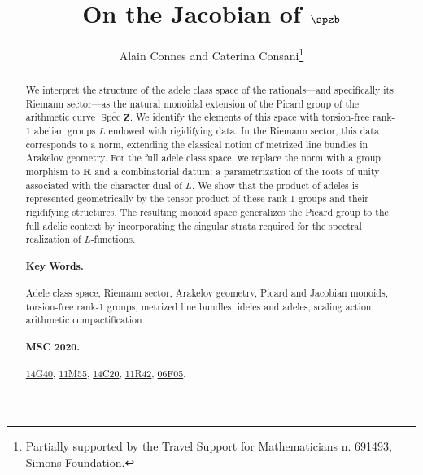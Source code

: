 \documentclass[11pt,a4paper]{article}
\title{On the Jacobian of $\spzb$}
\author{Alain Connes and Caterina Consani\thanks{Partially supported by the Travel Support for Mathematicians n. 691493, Simons Foundation.}}
\date{}
\newcommand{\Z}{\mathbf{Z}}
\newcommand{\R}{\mathbf{R}}
\theoremstyle{plain}
\theoremstyle{definition} %
\begin{document}
\maketitle

\begin{abstract}
\noindent We interpret the structure of the adele class space of the rationals—and specifically its Riemann sector—as the natural monoidal extension of the Picard group of the arithmetic curve $\overline{\operatorname{Spec} \Z}$.  We identify the elements of this space with torsion-free rank-1 abelian groups $L$ endowed with rigidifying data. In the Riemann sector, this data corresponds to a norm, extending the classical notion of metrized line bundles in Arakelov geometry. For the full adele class space, we replace the norm with a group morphism to $\R$ and a combinatorial datum: a parametrization of the roots of unity associated with the character dual of $L$. We show that the product of adeles is represented geometrically by the tensor product of these rank-1 groups and their rigidifying structures. 
The resulting monoid space generalizes the Picard group to the full adelic context by incorporating the singular strata required for the spectral realization of $L$-functions.

\paragraph{Key Words.} Adele class space, Riemann sector, Arakelov geometry, \sloppy Picard and Jacobian monoids, torsion-free rank-1 groups, metrized line bundles, ideles and adeles,  scaling action, arithmetic compactification.

\paragraph{MSC 2020.}  
\href{http://www.ams.org/mathscinet/msc/msc2020.html?t=14G40&btn=Current}{14G40}, %
\href{http://www.ams.org/mathscinet/msc/msc2020.html?t=11M55&btn=Current}{11M55}, %
\href{http://www.ams.org/mathscinet/msc/msc2020.html?t=14C20&btn=Current}{14C20}, %
\href{http://www.ams.org/mathscinet/msc/msc2020.html?t=11R42&btn=Current}{11R42}, %
\href{http://www.ams.org/mathscinet/msc/msc2020.html?t=06F05&btn=Current}{06F05}. %

\end{abstract}
\tableofcontents
\end{document}
